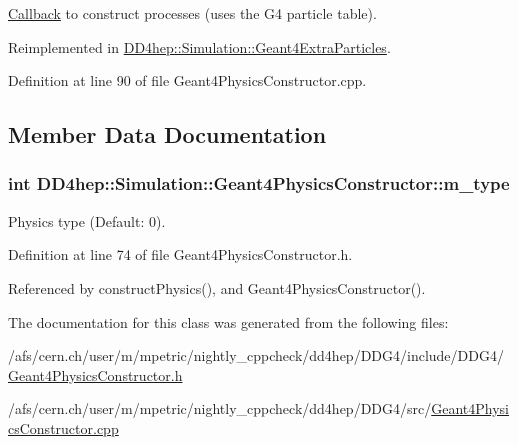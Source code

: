 \hyperlink{class_d_d4hep_1_1_callback}{Callback} to construct processes (uses the G4 particle table). 

Reimplemented in \hyperlink{class_d_d4hep_1_1_simulation_1_1_geant4_extra_particles_aa87e3c12da9259e49a15a35a5c76698c}{DD4hep::Simulation::Geant4ExtraParticles}.

Definition at line 90 of file Geant4PhysicsConstructor.cpp.

\subsection{Member Data Documentation}
\hypertarget{class_d_d4hep_1_1_simulation_1_1_geant4_physics_constructor_ac262f2205619b69465908a66dc16b296}{
\subsubsection[{m\_\-type}]{\setlength{\rightskip}{0pt plus 5cm}int {\bf DD4hep::Simulation::Geant4PhysicsConstructor::m\_\-type}}}
\label{class_d_d4hep_1_1_simulation_1_1_geant4_physics_constructor_ac262f2205619b69465908a66dc16b296}


Physics type (Default: 0). 

Definition at line 74 of file Geant4PhysicsConstructor.h.

Referenced by constructPhysics(), and Geant4PhysicsConstructor().

The documentation for this class was generated from the following files:\begin{DoxyCompactItemize}
\item 
/afs/cern.ch/user/m/mpetric/nightly\_\-cppcheck/dd4hep/DDG4/include/DDG4/\hyperlink{_geant4_physics_constructor_8h}{Geant4PhysicsConstructor.h}\item 
/afs/cern.ch/user/m/mpetric/nightly\_\-cppcheck/dd4hep/DDG4/src/\hyperlink{_geant4_physics_constructor_8cpp}{Geant4PhysicsConstructor.cpp}\end{DoxyCompactItemize}
